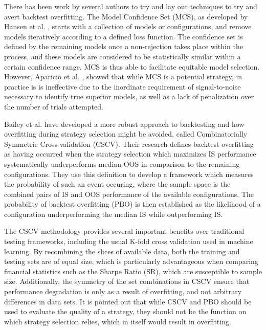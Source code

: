 \documentclass[a4paper,11pt,oneside]{article}
\theoremstyle{plain}
\theoremstyle{definition}
\begin{document}
There has been work by several authors to try and lay out techniques to try and avert backtest overfitting. 
The Model Confidence Set (MCS), as developed by Hansen et al. \cite{Hansen}, starts with a 
collection of models or configurations, and remove models iteratively according to a defined loss function. 
The confidence set is defined by the remaining models once a non-rejection takes place within the process, and 
these models are considered to be statistically similar within a certain confidence range. MCS is thus able to facilitate 
equitable model selection. However, Aparicio et al. \cite{Aparicio}, showed  that while MCS is a potential strategy, in 
practice is is ineffective due to the inordinate requirement of signal-to-noise necessary to identify true superior 
models, as well as a lack of penalization over the number of trials attempted.
\hfill \break

Bailey et al. \cite{BailyPBO} have developed a more robust approach to backtesting and how overfitting during strategy 
selection might be avoided, called Combinatorially Symmetric Cross-validation (CSCV). Their research defines backtest overfitting as having occurred when the strategy selection which maximizes IS performance systematically underperforms median OOS in comparison to the remaining configurations. They use this definition to develop a framework which measures the probability of such an event occuring, where the sample space is the combined pairs of IS and OOS performance of the available configurations. The probability of backtest overfitting (PBO) is then established as the likelihood of a configuration underperforming the median IS while outperforming IS. 
\hfill \break 

The CSCV methodology provides several important benefits over traditional testing 
frameworks, including the usual K-fold cross validation used in machine learning. By recombining the slices of 
available data, both the training and testing sets are of equal size, which is particularly advantageous when comparing 
financial statistics such as the Sharpe Ratio (SR), which are susceptible to sample size. Additionally, the symmetry 
of the set combinations in CSCV ensure that performance degradation is only as a result of overfitting, and not 
arbitrary differences in data sets. It is pointed out that while CSCV and PBO should be used to evaluate the quality 
of a strategy, they should not be the function on which strategy selection relies, which in itself would result in overfitting.
\hfill \break 
\end{document}
